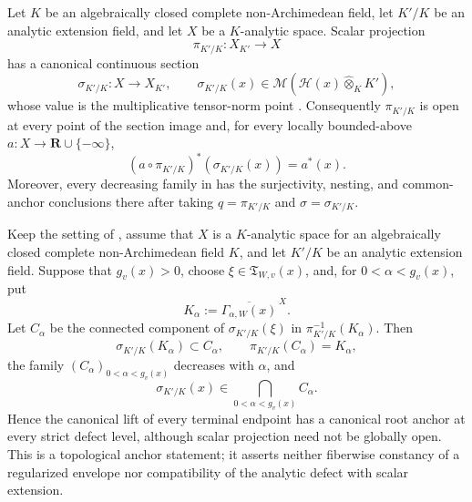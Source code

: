 \begin{corollary}
\label{cor:p031-canonical-scalar-section-anchor}
Let $K$ be an algebraically closed complete non-Archimedean field, let
$K'/K$ be an analytic extension field, and let $X$ be a $K$-analytic space.
Scalar projection
\[
                    \pi_{K'/K}:X_{K'}\longrightarrow X
\]
has a canonical continuous section
\[
 \sigma_{K'/K}:X\longrightarrow X_{K'},
 \qquad
 \sigma_{K'/K}(x)
  \in\mathcal M\!\left(\mathcal H(x)\widehat\otimes_KK'\right),
\]
whose value is the multiplicative tensor-norm point
\cite[Definition~3.2, Corollary~3.7, Remark~3.13, and
Corollary~3.14]{Poi13Angelic}.
Consequently $\pi_{K'/K}$ is open at every point of the section image and,
for every locally bounded-above
$a:X\to\mathbf R\cup\{-\infty\}$,
\begin{equation}
\label{eq:p031-canonical-scalar-section-regularization}
 (a\circ\pi_{K'/K})^*(\sigma_{K'/K}(x))=a^*(x).
\end{equation}
Moreover, every decreasing family in
 has the
surjectivity, nesting, and common-anchor conclusions there after taking
$q=\pi_{K'/K}$ and $\sigma=\sigma_{K'/K}$.
\end{corollary}

\begin{corollary}
\label{cor:p031-canonical-scalar-persistent-terminal-anchor}
Keep the setting of
, assume that $X$ is
a $K$-analytic space for an algebraically closed complete
non-Archimedean field $K$, and let $K'/K$ be an analytic extension field.
Suppose that $g_v(x)>0$, choose
$\xi\in\mathfrak T_{W,v}(x)$, and, for
$0<\alpha<g_v(x)$, put
\[
        K_\alpha:=\overline{\Gamma_{\alpha,W}(x)}^{\,X}.
\]
Let $C_\alpha$ be the connected component of
$\sigma_{K'/K}(\xi)$ in $\pi_{K'/K}^{-1}(K_\alpha)$.  Then
\begin{equation}
\label{eq:p031-canonical-scalar-terminal-component}
 \sigma_{K'/K}(K_\alpha)\subset C_\alpha,
 \qquad
 \pi_{K'/K}(C_\alpha)=K_\alpha,
\end{equation}
the family $(C_\alpha)_{0<\alpha<g_v(x)}$ decreases with $\alpha$, and
\begin{equation}
\label{eq:p031-canonical-scalar-persistent-terminal-anchor}
          \sigma_{K'/K}(x)
             \in\bigcap_{0<\alpha<g_v(x)}C_\alpha.
\end{equation}
Hence the canonical lift of every terminal endpoint has a canonical root
anchor at every strict defect level, although scalar projection need not be
globally open.  This is a topological anchor statement; it asserts neither
fiberwise constancy of a regularized envelope nor compatibility of the
analytic defect with scalar extension.
\end{corollary}
